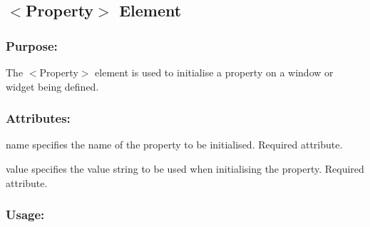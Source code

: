 \begin{DoxyCode}{0}
\end{DoxyCode}
\hypertarget{fal_element_ref_fal_elem_ref_sec_25}{}\subsection{$<$\+Property$>$ Element}\label{fal_element_ref_fal_elem_ref_sec_25}
\hypertarget{fal_element_ref_fal_elem_ref_sec_25_1}{}\subsubsection{Purpose\+:}\label{fal_element_ref_fal_elem_ref_sec_25_1}
The {\ttfamily $<$Property$>$} element is used to initialise a property on a window or widget being defined.\hypertarget{fal_element_ref_fal_elem_ref_sec_25_2}{}\subsubsection{Attributes\+:}\label{fal_element_ref_fal_elem_ref_sec_25_2}
\begin{DoxyItemize}
\item {\ttfamily name} specifies the name of the property to be initialised. Required attribute. \item {\ttfamily value} specifies the value string to be used when initialising the property. Required attribute.\end{DoxyItemize}
\hypertarget{fal_element_ref_fal_elem_ref_sec_25_3}{}\subsubsection{Usage\+:}\label{fal_element_ref_fal_elem_ref_sec_25_3}

